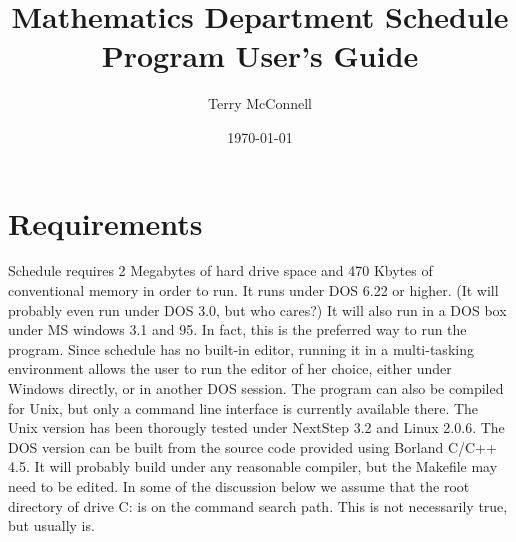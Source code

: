 

\title{Mathematics Department Schedule Program User's Guide}
\author{Terry McConnell}
\date{\today}
\maketitle
\tableofcontents
\sf

\section{Requirements}
Schedule requires 2 Megabytes of hard drive space and 470 Kbytes of 
conventional memory in order to run. It runs under DOS 6.22 or higher.
(It will probably even run under DOS 3.0, but who cares?) It will also
run in a DOS box under MS windows 3.1 and 95. In fact, this is the
preferred way to run the program. Since schedule has no built-in editor,
running it in a multi-tasking environment allows the user to run the
editor of her choice, either under Windows directly, or in another DOS
session. The program can also be compiled for Unix, but only a command line
interface is currently available there. The Unix version has been 
thorougly tested under NextStep 3.2 and Linux 2.0.6. The DOS version 
can be built from the source code provided using Borland C/C++ 4.5. It will
probably build under any reasonable compiler, but the Makefile may need
to be edited.
In some of the discussion below we assume that the root directory of drive
C: is on the command search path. This is not necessarily true, but usually
is.

